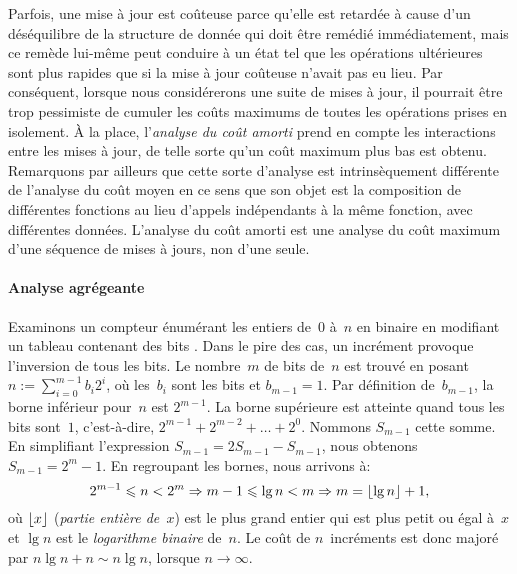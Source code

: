 \label{par:amortised_cost}

Parfois, une mise à jour est coûteuse parce qu'elle est retardée à
cause d'un déséquilibre de la structure de donnée qui doit être
remédié immédiatement, mais ce remède lui-même peut conduire à un état
tel que les opérations ultérieures sont plus rapides que si la mise à
jour coûteuse n'avait pas eu lieu. Par conséquent, lorsque nous
considérerons une suite de mises à jour, il pourrait être trop
pessimiste de cumuler les coûts maximums de toutes les opérations
prises en isolement. À la place, l'\emph{analyse du coût amorti}
\citep{Okasaki_1998a} \citep[\S{}17]{CLRS_2009} prend en compte les interactions entre les mises à jour, de
telle sorte qu'un coût maximum plus bas est obtenu. Remarquons par
ailleurs que cette sorte d'analyse est intrinsèquement différente de
l'analyse du coût moyen en ce sens que son objet est la composition de
différentes fonctions au lieu d'appels indépendants à la même
fonction, avec différentes données. L'analyse du coût amorti est une
analyse du coût maximum d'une séquence de mises à jours, non d'une
seule.

\paragraph{Analyse agrégeante}
\label{par:aggregate}

Examinons un compteur énumérant les entiers de~\(0\) à~\(n\) en
binaire en modifiant un tableau contenant des bits
\cite[\S{}17.1]{CLRS_2009}. Dans le pire des cas, un incrément
provoque l'inversion de tous les bits. Le nombre~\(m\) de bits
de~\(n\) est trouvé en posant \(n := \sum_{i=0}^{m-1}{b_i2^i}\), où
les~\(b_i\) sont les bits et \(b_{m-1}=1\). Par définition
de~\(b_{m-1}\), la borne inférieur pour~\(n\) est \(2^{m-1}\). La
borne supérieure est atteinte quand tous les bits sont~\(1\),
c'est-à-dire, \(2^{m-1} + 2^{m-2} + \ldots + 2^0\). Nommons
\(S_{m-1}\) cette somme. En simplifiant l'expression \(S_{m-1} = 2
S_{m-1} - S_{m-1}\), nous obtenons \(S_{m-1} = 2^m - 1\). En regroupant
les bornes, nous arrivons à:
\begin{equation}
2^{m-1} \leqslant n < 2^m \Rightarrow m - 1 \leqslant \lg n
< m \Rightarrow m = \lfloor{\lg n}\rfloor + 1,
\label{eq:num_of_bits}
\end{equation}
où \(\lfloor{x}\rfloor\) (\textsl{partie entière de~\(x\)}) est
le plus grand entier qui est plus petit ou égal à~\(x\) et \(\lg n\)
est le \emph{logarithme binaire} de~\(n\). Le coût de \(n\)~incréments
est donc majoré par \(n\lg n + n \sim n\lg n\), lorsque \(n
\rightarrow \infty\).

